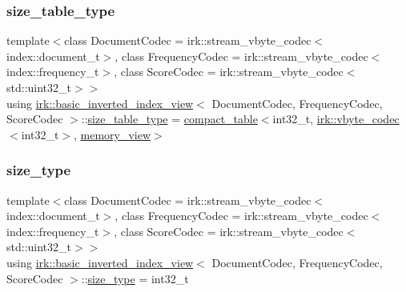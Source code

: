\mbox{\label{classirk_1_1basic__inverted__index__view_a55dabda525be5920c6faeaa009c2c918}} 
\subsubsection{\texorpdfstring{size\+\_\+table\+\_\+type}{size\_table\_type}}
{\footnotesize\ttfamily template$<$class Document\+Codec  = irk\+::stream\+\_\+vbyte\+\_\+codec$<$index\+::document\+\_\+t$>$, class Frequency\+Codec  = irk\+::stream\+\_\+vbyte\+\_\+codec$<$index\+::frequency\+\_\+t$>$, class Score\+Codec  = irk\+::stream\+\_\+vbyte\+\_\+codec$<$std\+::uint32\+\_\+t$>$$>$ \\
using \mbox{\hyperlink{classirk_1_1basic__inverted__index__view}{irk\+::basic\+\_\+inverted\+\_\+index\+\_\+view}}$<$ Document\+Codec, Frequency\+Codec, Score\+Codec $>$\+::\mbox{\hyperlink{classirk_1_1basic__inverted__index__view_a55dabda525be5920c6faeaa009c2c918}{size\+\_\+table\+\_\+type}} =  \mbox{\hyperlink{classirk_1_1compact__table}{compact\+\_\+table}}$<$int32\+\_\+t, \mbox{\hyperlink{structirk_1_1vbyte__codec}{irk\+::vbyte\+\_\+codec}}$<$int32\+\_\+t$>$, \mbox{\hyperlink{classirk_1_1memory__view}{memory\+\_\+view}}$>$}

\mbox{\label{classirk_1_1basic__inverted__index__view_a57ae4c0a2a602340c31996d3e240be46}} 
\subsubsection{\texorpdfstring{size\+\_\+type}{size\_type}}
{\footnotesize\ttfamily template$<$class Document\+Codec  = irk\+::stream\+\_\+vbyte\+\_\+codec$<$index\+::document\+\_\+t$>$, class Frequency\+Codec  = irk\+::stream\+\_\+vbyte\+\_\+codec$<$index\+::frequency\+\_\+t$>$, class Score\+Codec  = irk\+::stream\+\_\+vbyte\+\_\+codec$<$std\+::uint32\+\_\+t$>$$>$ \\
using \mbox{\hyperlink{classirk_1_1basic__inverted__index__view}{irk\+::basic\+\_\+inverted\+\_\+index\+\_\+view}}$<$ Document\+Codec, Frequency\+Codec, Score\+Codec $>$\+::\mbox{\hyperlink{classirk_1_1basic__inverted__index__view_a57ae4c0a2a602340c31996d3e240be46}{size\+\_\+type}} =  int32\+\_\+t}


